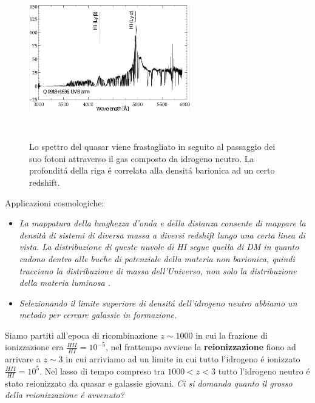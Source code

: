 \documentclass[12pt, a4paper]{article}
\begin{document}
\begin{figure}[htp]
\centering
\includegraphics[width=7cm, height=7cm]{images/lyalpha.png}
\caption{Lo spettro del quasar viene frastagliato in seguito al passaggio dei suo fotoni attraverso il gas composto da idrogeno neutro. La profondit\'{a} della riga \'{e} correlata alla densit\'{a} barionica ad un certo redshift.}
\label{fig:lyalpha}
\end{figure}
Applicazioni cosmologiche:
\begin{itemize}
\item \textit{La mappatura della lunghezza d'onda e della distanza consente di mappare la densità di sistemi di diversa massa a diversi redshift lungo una certa linea di vista. La distribuzione di queste nuvole di HI segue quella di DM in quanto cadono dentro alle buche di potenziale della materia non barionica, quindi tracciano la distribuzione di massa dell'Universo, non solo la distribuzione della materia luminosa .}
\item \textit{Selezionando il limite superiore di densit\'{a} dell'idrogeno neutro abbiamo un metodo per cercare galassie in formazione.}
\end{itemize}
Siamo partiti all'epoca di ricombinazione $z\sim 1000$ in cui la frazione di ionizzazione era $\frac{HII}{HI}=10^{-5}$, nel frattempo avviene la \textbf{reionizzazione} fiono ad arrivare a $z\sim 3$ in cui arriviamo ad un limite in cui tutto l'idrogeno \'{e} ionizzato $\frac{HII}{HI}=10^{5}$. Nel lasso di tempo compreso tra $1000<z<3$ tutto l'idrogeno neutro \'{e} stato reionizzato da quasar e galassie giovani. \textit{Ci si domanda quanto il grosso della reionizzazione \'{e} avvenuto?}
\end{document}
